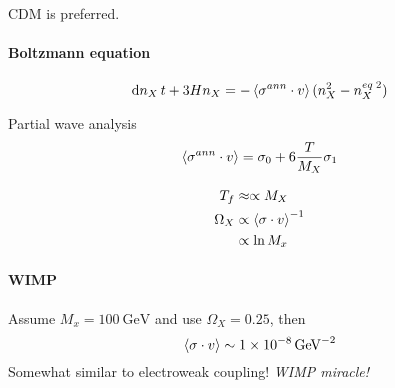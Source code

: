 \documentclass[12pt, a4paper, DIV=15]{article}
\numberwithin{equation}{section}
\begin{document}
CDM is preferred.

\paragraph{Boltzmann equation}
\begin{equation}
   \dd{n_X}{t} + 3 Hn_X = - \expval{\sigma^{ann}\cdot v} (n_X^2 - n^{eq\; 2}_X)
\end{equation}

Partial wave analysis
\begin{equation}
   \expval{\sigma^{ann}\cdot v} = \sigma_0 + 6 \frac{T}{M_X} \sigma_1
\end{equation}

\begin{align}
   T_f &\approx \propto M_X \\
   \Omega_X &\propto \expval{\sigma \cdot v}^{-1} \\
       &\propto \ln M_x
\end{align}

\paragraph{WIMP}
Assume $M_x = \SI{100}{\giga \eV}$ and use $\Omega_X = 0.25$, then
\begin{equation}
   \expval{\sigma \cdot v} \sim \SI{1e-8}{\giga\eV\tothe{-2}}
\end{equation}
Somewhat similar to electroweak coupling! \textit{WIMP miracle!}
\end{document}
